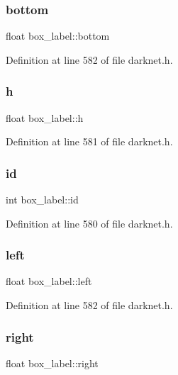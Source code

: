 \subsubsection{\texorpdfstring{bottom}{bottom}}
{\footnotesize\ttfamily float box\+\_\+label\+::bottom}



Definition at line 582 of file darknet.\+h.

\mbox{\label{structbox__label_a16f7c9ecdbd1919c153e7b3aa07f8d64}} 
\subsubsection{\texorpdfstring{h}{h}}
{\footnotesize\ttfamily float box\+\_\+label\+::h}



Definition at line 581 of file darknet.\+h.

\mbox{\label{structbox__label_a70328738c0d38547cd93d2fa59310a31}} 
\subsubsection{\texorpdfstring{id}{id}}
{\footnotesize\ttfamily int box\+\_\+label\+::id}



Definition at line 580 of file darknet.\+h.

\mbox{\label{structbox__label_adbd27415d605f29a7022298fd615ed75}} 
\subsubsection{\texorpdfstring{left}{left}}
{\footnotesize\ttfamily float box\+\_\+label\+::left}



Definition at line 582 of file darknet.\+h.

\mbox{\label{structbox__label_a4c7c88557656ba121f112021522b5837}} 
\subsubsection{\texorpdfstring{right}{right}}
{\footnotesize\ttfamily float box\+\_\+label\+::right}



